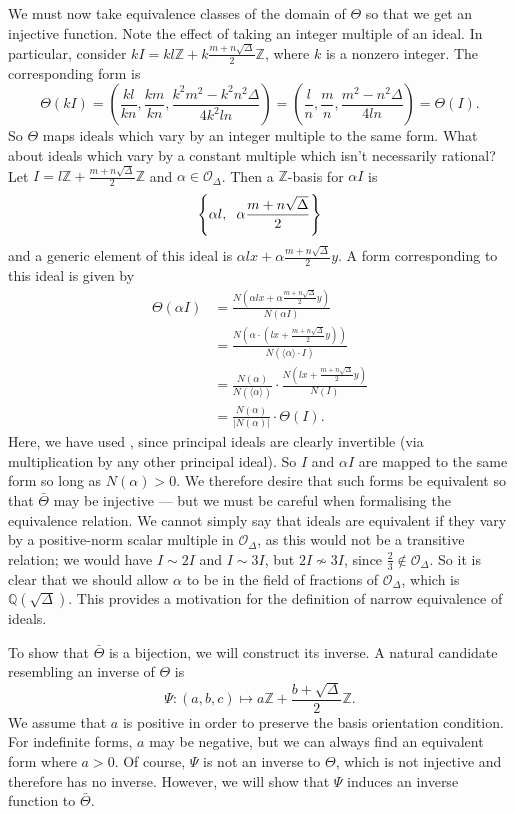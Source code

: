 \documentclass[honours,12pt]{unswthesis}
\newcommand{\Z}{\mathbb{Z}} %
\newcommand{\Q}{\mathbb{Q}} %
\newcommand{\order}{\mathcal{O}} %
\numberwithin{equation}{section}
\begin{document}
We must now take equivalence classes of the domain of $\Theta$ so that we get an injective function.
Note the effect of taking an integer multiple of an ideal.
In particular, consider $kI = kl\Z + k\frac{m + n\sqrt\Delta}{2}\Z$, where $k$ is a nonzero integer.
The corresponding form is
$$\Theta(kI) = \left( \frac{kl}{kn}, \frac{km}{kn}, \frac{k^2m^2 - k^2n^2\Delta}{4k^2ln} \right) = \left( \frac{l}{n}, \frac{m}{n}, \frac{m^2 - n^2\Delta}{4ln} \right) = \Theta(I).$$
So $\Theta$ maps ideals which vary by an integer multiple to the same form.
What about ideals which vary by a constant multiple which isn't necessarily rational?
Let $I = l\Z + \frac{m + n\sqrt\Delta}{2}\Z$ and $\alpha \in \order_\Delta$.
Then a $\Z$-basis for $\alpha I$ is 
$$\left\{\alpha l, \hspace{2mm} \alpha \frac{m + n\sqrt\Delta}{2}\right\}$$
and a generic element of this ideal is $\alpha l x + \alpha \frac{m + n\sqrt\Delta}{2} y$.
A form corresponding to this ideal is given by
\begin{align*}
    \Theta(\alpha I) &= \frac{N \left( \alpha l x + \alpha \frac{m + n\sqrt\Delta}{2} y \right)}{N(\alpha I)} \\
    &= \frac{N \left(\alpha \cdot \left( l x + \frac{m + n\sqrt\Delta}{2} y \right) \right)}{N(\langle \alpha \rangle \cdot I)} \\
    &= \frac{N(\alpha)}{N(\langle \alpha \rangle)} \cdot \frac{N \left( l x + \frac{m + n\sqrt\Delta}{2} y \right) }{N(I)} \\
    &= \frac{N(\alpha)}{\left| N(\alpha) \right|} \cdot \Theta(I).
\end{align*}
Here, we have used , since principal ideals are clearly invertible (via multiplication by any other principal ideal).
So $I$ and $\alpha I$ are mapped to the same form so long as $N(\alpha) > 0$.
We therefore desire that such forms be equivalent so that $\bar{\Theta}$ may be injective --- but we must be careful when formalising the equivalence relation.
We cannot simply say that ideals are equivalent if they vary by a positive-norm scalar multiple in $\order_\Delta$, as this would not be a transitive relation;
we would have $I \sim 2I$ and $I \sim 3I$, but $2I \nsim 3I$, since $\frac{2}{3} \notin \order_\Delta$.
So it is clear that we should allow $\alpha$ to be in the field of fractions of $\order_\Delta$, which is $\Q(\sqrt\Delta)$.
This provides a motivation for the definition of narrow equivalence of ideals.

To show that $\bar{\Theta}$ is a bijection, we will construct its inverse.
A natural candidate resembling an inverse of $\Theta$ is
$$\Psi : (a, b, c) \longmapsto a\Z + \frac{b + \sqrt\Delta}{2}\Z.$$
We assume that $a$ is positive in order to preserve the basis orientation condition.
For indefinite forms, $a$ may be negative, but we can always find an equivalent form where $a > 0$.
Of course, $\Psi$ is not an inverse to $\Theta$, which is not injective and therefore has no inverse.
However, we will show that $\Psi$ induces an inverse function to $\bar{\Theta}$.
\end{document}
